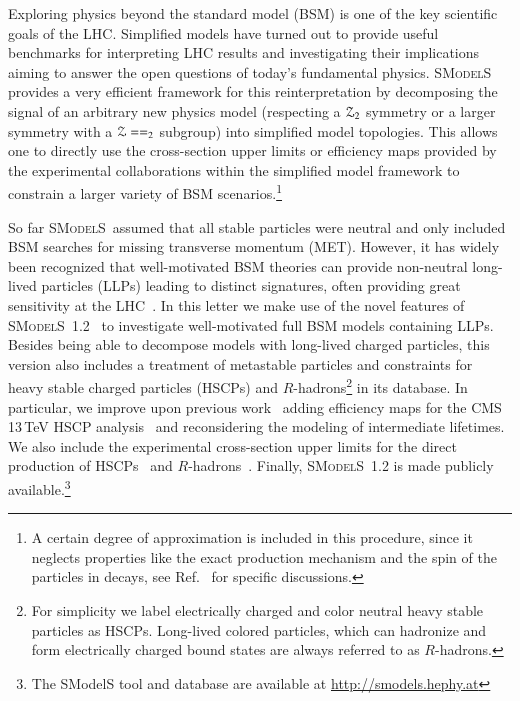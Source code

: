 \documentclass[preprint,number,sort&compress,twocolumn,3p]{elsstyarticle}
\newcommand{\smo}{\textsc{SModelS}}
\newcommand{\com}[1]{\emph{\color{red}[#1]}}  %
\begin{document}
Exploring physics beyond the standard model (BSM) is one of the key scientific goals of 
the LHC\@.
Simplified models have turned out to provide useful 
benchmarks for interpreting LHC results and investigating their implications
aiming to answer the open questions of today's fundamental physics. \smo~\cite{Kraml:2013mwa,Ambrogi:2017neo}
provides a very efficient framework for this
reinterpretation by decomposing the signal of an arbitrary new physics model (respecting a  ${\cal{Z}}_2$ 
symmetry or a larger symmetry with a  ${\cal{Z}}==_2$ subgroup) into simplified model topologies.
This allows one to directly use the cross-section upper limits or efficiency maps provided by the experimental 
collaborations within the simplified model framework to constrain a larger
variety of BSM scenarios.\footnote{A certain degree of approximation is included in this procedure, since it  neglects properties like the exact production mechanism and the spin of the  particles in decays, see Ref.~\cite{Edelhauser:2014ena,Edelhauser:2015ksa,Arina:2015uea,Kraml:2016eti} for specific discussions.}

So far \smo~assumed that all stable particles were neutral and only included BSM searches for missing transverse momentum (MET).
However, it has widely been recognized that well-motivated
BSM theories can provide non-neutral long-lived particles (LLPs) leading to distinct signatures,
often providing great sensitivity at the LHC~\cite{}.
In this letter we make use of the novel features of \smo~1.2~\cite{smodlesnote} to investigate well-motivated
full BSM models containing LLPs.
Besides being able to decompose models with long-lived 
charged particles, this version also includes a treatment of metastable particles and constraints for heavy stable
charged particles (HSCPs) and $R$-hadrons\footnote{For simplicity we label electrically charged and color neutral heavy stable particles as HSCPs. Long-lived colored particles, which can hadronize and form electrically charged bound states are always referred to as $R$-hadrons.} in its database.
In particular, we improve upon previous work~\cite{Heisig:2015yla} adding 
efficiency maps for the CMS 13\,TeV HSCP analysis~\cite{CMS-PAS-EXO-16-036} and reconsidering the modeling of intermediate lifetimes.
We also include the experimental 
cross-section upper limits for the direct production of HSCPs~\cite{Khachatryan:2015lla,CMS-PAS-EXO-16-036} and $R$-hadrons~\cite{CMS-PAS-EXO-16-036}.
Finally, \smo~1.2 is made publicly available.\footnote{The SModelS tool and database are available at \href{http://smodels.hephy.at}{http://smodels.hephy.at}}
\end{document}
